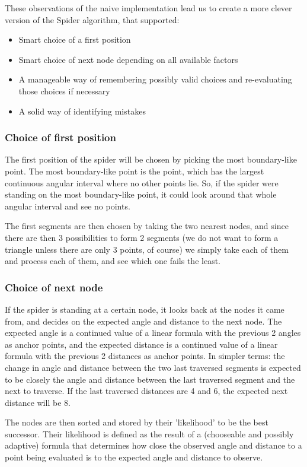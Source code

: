 \documentclass[11pt]{article}
\begin{document}
These observations of the naive implementation lead us to create a more clever version of the Spider algorithm, that supported:
\begin{itemize}
\item Smart choice of a first position
\item Smart choice of next node depending on all available factors
\item A manageable way of remembering possibly valid choices and re-evaluating those choices if necessary
\item A solid way of identifying mistakes
\end{itemize}


\subsubsection{Choice of first position} 

The first position of the spider will be chosen by picking the most boundary-like point. The most boundary-like point is the point, which has the largest continuous angular interval where no other points lie. So, if the spider were standing on the most boundary-like point, it could look around that whole angular interval and see no points.

The first segments are then chosen by taking the two nearest nodes, and since there are then 3 possibilities to form 2 segments (we do not want to form a triangle unless there are only 3 points, of course) we simply take each of them and process each of them, and see which one fails the least.

\subsubsection{Choice of next node} 

If the spider is standing at a certain node, it looks back at the nodes it came from, and decides on the expected angle and distance to the next node. The expected angle is a continued value of a linear formula with the previous 2 angles as anchor points, and the expected distance is a continued value of a linear formula with the previous 2 distances as anchor points. In simpler terms: the change in angle and distance between the two last traversed segments is expected to be closely the angle and distance between the last traversed segment and the next to traverse. If the last traversed distances are 4 and 6, the expected next distance will be 8.

The nodes are then sorted and stored by their 'likelihood' to be the best successor. Their likelihood is defined as the result of a (chooseable and possibly adaptive) formula that determines how close the observed angle and distance to a point being evaluated is to the expected angle and distance to observe.
\end{document}
